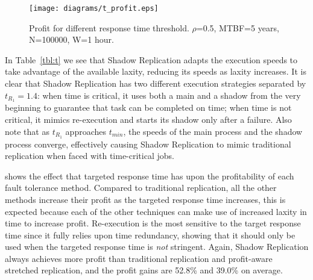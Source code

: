 \begin{figure}[!h]	
	\begin{center}
		\texttt{[image: diagrams/t\_profit.eps]}
	\end{center}
	\caption{Profit for different response time threshold. $\rho$=0.5, MTBF=5 years, N=100000, W=1 hour.}
	\label{fig:t}
\end{figure}

In Table~\ref{tbl:t} we see that Shadow Replication adapts the execution
speeds to take advantage of the available laxity, reducing its speeds
as laxity increases. It is clear that Shadow Replication has two different execution strategies separated by $t_{R_1}=1.4$: when time is critical, it uses both a main and a shadow from the very beginning to guarantee that task can be completed on time; when time is not critical, it mimics re-execution and starts its shadow only after a failure.
Also note that as $t_{R_1}$
approaches $t_{min}$, the speeds of the main process and the shadow process
converge, effectively causing Shadow Replication to mimic traditional
replication when faced with time-critical jobs.

 shows the effect that targeted response time has upon
the profitability of each fault tolerance method. Compared to traditional replication, all the other methods increase their profit as the targeted
response time increases, this is expected because each of the other
techniques can make use of increased laxity in time to increase
profit. Re-execution is the most sensitive to the target response
time since it fully relies upon time redundancy, showing that it should only be used when the targeted response time is \emph{not} stringent. 
Again, Shadow Replication always achieves more profit than traditional
replication and profit-aware stretched replication, and the profit
gains are 52.8\% and 39.0\% on average. 

